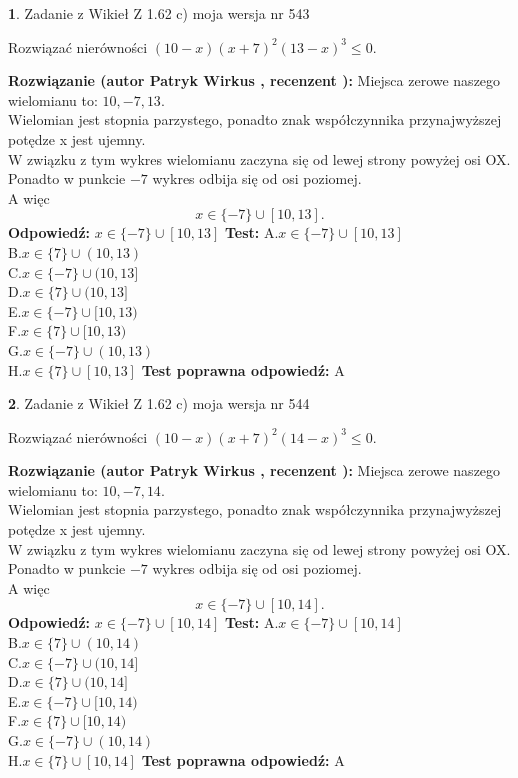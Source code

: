 \documentclass[12pt, a4paper]{article}
\theoremstyle{definition} %
\newtheorem{zad}{}
\newcommand{\zadStart}[1]{\begin{zad}#1\newline}
\newcommand{\zadStop}{\end{zad}}
\newcommand{\rozwStart}[2]{\noindent \textbf{Rozwiązanie (autor #1 , recenzent #2): }\newline}
\newcommand{\rozwStop}{\newline}
\newcommand{\odpStart}{\noindent \textbf{Odpowiedź:}\newline}
\newcommand{\odpStop}{\newline}
\newcommand{\testStart}{\noindent \textbf{Test:}\newline}
\newcommand{\testStop}{\newline}
\newcommand{\kluczStart}{\noindent \textbf{Test poprawna odpowiedź:}\newline}
\newcommand{\kluczStop}{\newline}
\begin{document}
\zadStart{Zadanie z Wikieł Z 1.62 c) moja wersja nr 543}

Rozwiązać nierówności $(10-x)(x+7)^{2}(13-x)^{3}\le0$.
\zadStop
\rozwStart{Patryk Wirkus}{}
Miejsca zerowe naszego wielomianu to: $10, -7, 13$.\\
Wielomian jest stopnia parzystego, ponadto znak współczynnika przy\linebreak najwyższej potędze x jest ujemny.\\ W związku z tym wykres wielomianu zaczyna się od lewej strony powyżej osi OX.\\
Ponadto w punkcie $-7$ wykres odbija się od osi poziomej.\\
A więc $$x \in \{-7\} \cup [10,13].$$
\rozwStop
\odpStart
$x \in \{-7\} \cup [10,13]$
\odpStop
\testStart
A.$x \in \{-7\} \cup [10,13]$\\
B.$x \in \{7\} \cup (10,13)$\\
C.$x \in \{-7\} \cup (10,13]$\\
D.$x \in \{7\} \cup (10,13]$\\
E.$x \in \{-7\} \cup [10,13)$\\
F.$x \in \{7\} \cup [10,13)$\\
G.$x \in \{-7\} \cup (10,13)$\\
H.$x \in \{7\} \cup [10,13]$
\testStop
\kluczStart
A
\kluczStop



\zadStart{Zadanie z Wikieł Z 1.62 c) moja wersja nr 544}

Rozwiązać nierówności $(10-x)(x+7)^{2}(14-x)^{3}\le0$.
\zadStop
\rozwStart{Patryk Wirkus}{}
Miejsca zerowe naszego wielomianu to: $10, -7, 14$.\\
Wielomian jest stopnia parzystego, ponadto znak współczynnika przy\linebreak najwyższej potędze x jest ujemny.\\ W związku z tym wykres wielomianu zaczyna się od lewej strony powyżej osi OX.\\
Ponadto w punkcie $-7$ wykres odbija się od osi poziomej.\\
A więc $$x \in \{-7\} \cup [10,14].$$
\rozwStop
\odpStart
$x \in \{-7\} \cup [10,14]$
\odpStop
\testStart
A.$x \in \{-7\} \cup [10,14]$\\
B.$x \in \{7\} \cup (10,14)$\\
C.$x \in \{-7\} \cup (10,14]$\\
D.$x \in \{7\} \cup (10,14]$\\
E.$x \in \{-7\} \cup [10,14)$\\
F.$x \in \{7\} \cup [10,14)$\\
G.$x \in \{-7\} \cup (10,14)$\\
H.$x \in \{7\} \cup [10,14]$
\testStop
\kluczStart
A
\kluczStop
\end{document}
